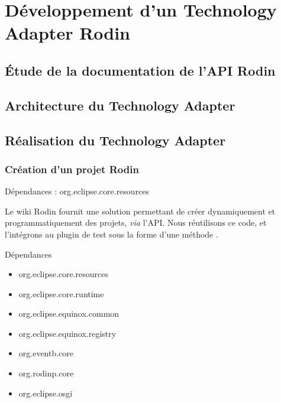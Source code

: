 \chapter{Développement d'un Technology Adapter Rodin}

\section{Étude de la documentation de l'API Rodin}

\section{Architecture du Technology Adapter}

\section{Réalisation du Technology Adapter}

\subsection{Création d'un projet Rodin}

Dépendances : org.eclipse.core.resources

Le wiki Rodin fournit une solution permettant de créer dynamiquement et programmatiquement des projets, \textit{via} l'API.
Nous réutilisons ce code, et l'intégrons au plugin de test sous la forme d'une méthode .



Dépendances

\begin{itemize}
    \item org.eclipse.core.resources
    \item org.eclipse.core.runtime
    \item org.eclipse.equinox.common
    \item org.eclipse.equinox.registry
    \item org.eventb.core
    \item org.rodinp.core
    \item org.eclipse.osgi
\end{itemize}
